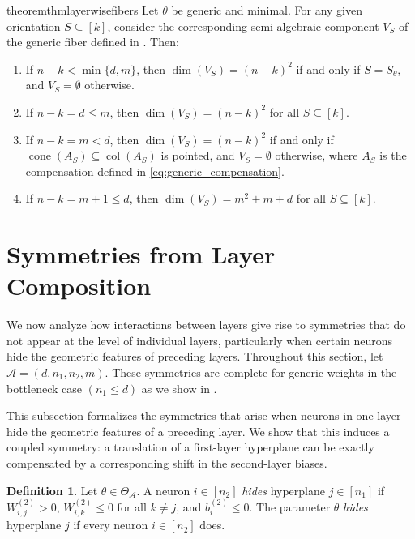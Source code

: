 \documentclass{article}
\theoremstyle{definition}
\newtheorem{definition}[theorem]{Definition}
\newcommand{\architecture}{\mathcal{A}}
\newcommand{\paramspace}[1]{\Theta_{#1}}
\newcommand{\weights}[1]{W^{(#1)}}
\newcommand{\bias}[1]{b^{(#1)}}
\newcommand{\col}{\operatorname{col}}
\begin{document}
\begin{restatable}{theorem}{thmlayerwisefibers}
\label{thm:layerwise-fibers}
Let $\theta$ be generic and minimal. 
For any given orientation $S\subseteq[k]$, consider the corresponding 
semi-algebraic component $V_S$ of the generic fiber defined in . 
Then: 
%
\begin{enumerate}[leftmargin=*]
    \item If $n-k < \min\{d,m\}$, then \(\dim(V_S) =(n-k)^2\)  if and only if $S = S_\theta$, and $V_S = \emptyset$ otherwise.  
    

    \item If $n-k = d \leq m$, then \(\dim(V_S) =(n-k)^2\) for all $S \subseteq [k]$.  

    \item If $n-k = m < d$, then
 \(\dim(V_S) =(n-k)^2\) if and only if $\operatorname{cone}(A_S) \subseteq \col(A_S)$ is pointed, and $V_S = \emptyset$ otherwise, where $A_S$ is the compensation defined in \eqref{eq:generic_compensation}. 

    \item If $n-k = m+1 \leq d$, then \(\dim(V_S) = m^2 + m +d \) for all $S \subseteq [k]$. 
    \end{enumerate} 
\end{restatable} 


\section{Symmetries from Layer Composition}
\label{sec:fibers_from_concatenation} 

We now analyze how interactions between layers give rise to symmetries that do not appear at the level of individual layers, particularly when certain neurons hide the geometric features of preceding layers. 
%
Throughout this section, let $\architecture = (d,n_1,n_2,m)$. 
These symmetries are complete for generic weights in the bottleneck case $(n_1 \leq d)$ as we show in .


This subsection formalizes the symmetries that arise when neurons in one layer hide the geometric features of a preceding layer. 
We show that this induces a coupled symmetry: 
a translation of a first-layer hyperplane 
can be exactly compensated by a corresponding shift in the second-layer biases. 


\begin{definition}
Let $\theta \in \paramspace{\architecture}$. 
A neuron $i \in [n_2]$ \emph{hides} 
hyperplane $j\in[n_1]$ if $\weights{2}_{i,j} >0$, $\weights{2}_{i,k} \leq 0$ for all $k \neq j$, and $\bias{2}_i \leq 0$. 
The parameter $\theta$ \emph{hides} hyperplane $j$ if every neuron $i \in [n_2]$ does. 
\end{definition}
\end{document}

